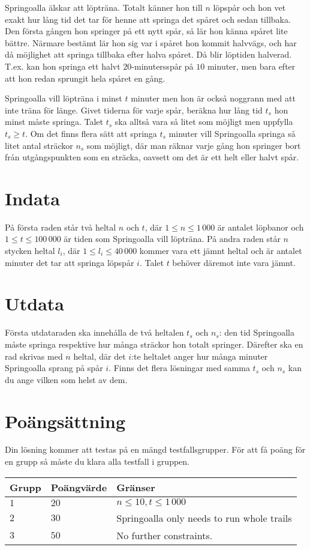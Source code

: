 Springoalla älskar att löpträna.
Totalt känner hon till $n$ löpspår och hon vet exakt hur lång tid det tar för henne att springa det spåret och sedan tillbaka.
Den första gången hon springer på ett nytt spår, så lär hon känna spåret lite bättre.
Närmare bestämt lär hon sig var i spåret hon kommit halvvägs, och har då möjlighet att springa tillbaka efter halva spåret.
Då blir löptiden halverad.
T.ex. kan hon springa ett halvt $20$-minutersspår på $10$ minuter, men bara efter att hon redan sprungit hela spåret en gång.

Springoalla vill löpträna i minst $t$ minuter men hon är också noggrann med att inte träna för länge.
Givet tiderna för varje spår, beräkna hur lång tid $t_s$ hon minst måste springa.
Talet $t_s$ ska alltså vara så litet som möjligt men uppfylla $t_s \ge t$.
Om det finns flera sätt att springa $t_s$ minuter vill Springoalla springa så litet antal sträckor $n_s$ som möjligt, där man räknar varje gång hon springer bort från utgångspunkten som en sträcka, oavsett om det är ett helt eller halvt spår.

\section*{Indata}
På första raden står två heltal $n$ och $t$, där $1 \le n \le 1\,000$ är antalet löpbanor och $1 \le t \le 100\,000$ är tiden som Springoalla vill löpträna.
På andra raden står $n$ stycken heltal $l_i$, där $1 \le l_i \le 40\,000$ kommer vara ett jämnt heltal och är antalet minuter det tar att springa löpspår $i$.
Talet $t$ behöver däremot inte vara jämnt.

\section*{Utdata}
Första utdataraden ska innehålla de två heltalen $t_s$ och $n_s$: den tid Springoalla måste springa respektive hur många sträckor hon totalt springer.
Därefter ska en rad skrivas med $n$ heltal, där det $i$:te heltalet anger hur många minuter Springoalla sprang på spår $i$.
Finns det flera lösningar med samma $t_s$ och $n_s$ kan du ange vilken som helst av dem.

\section*{Poängsättning}
Din lösning kommer att testas på en mängd testfallsgrupper.
För att få poäng för en grupp så måste du klara alla testfall i gruppen.

\noindent
\begin{tabular}{| l | l | p{12cm} |}
  \hline
  Grupp & Poängvärde & Gränser \\ \hline
  $1$    & $20$        & $n \le 10, t \le 1\,000$ \\ \hline 
  $2$    & $30$        & Springoalla only needs to run whole trails \\ \hline
  $3$    & $50$        & No further constraints. \\ \hline 
\end{tabular}

